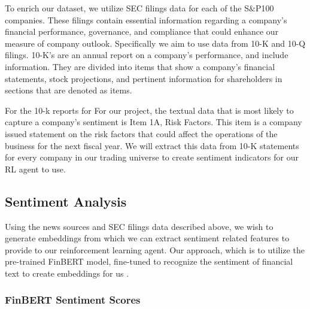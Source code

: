 To enrich our dataset, we utilize SEC filings data for each of the S$\&$P100 companies. 
These filings contain essential information regarding a company's financial 
performance, governance, and compliance that could enhance our measure of 
company outlook. Specifically we aim to use data from 10-K and 10-Q filings. 
10-K’s are an annual report on a company’s performance, and include information. 
They are divided into items that show a company’s financial statements, 
stock projections, and pertinent information for shareholders in sections that 
are denoted as items. 

For the 10-k reports for For our project, the textual data that is most likely to 
capture a company’s sentiment is Item 1A, Risk Factors. This item is a company 
issued statement on the risk factors that could affect the operations of the 
business for the next fiscal year. We will extract this data from 10-K statements 
for every company in our trading universe to create sentiment indicators for our 
RL agent to use. 

\subsection{Sentiment Analysis}

Using the news sources and SEC filings data described above, we wish to 
generate embeddings from which we can extract sentiment related features 
to provide to our reinforcement learning agent. Our approach, which is to utilize the pre-trained 
FinBERT model, fine-tuned to recognize the sentiment of financial text to 
create embeddings for us \cite{finbert}. 

\subsubsection{FinBERT Sentiment Scores}

